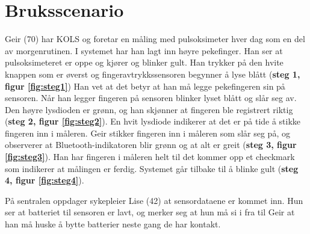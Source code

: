 \section{Bruksscenario}
Geir (70) har KOLS og foretar en måling med pulsoksimeter hver dag som en del av morgenrutinen. I systemet har han lagt
inn høyre pekefinger. Han ser at pulsoksimeteret
er oppe og kjører og blinker gult.
Han trykker på den hvite knappen som er øverst og fingeravtrykkssensoren begynner
å lyse blått (\textbf{steg 1, figur \ref{fig:steg1}})  Han vet at det betyr at han må legge pekefingeren sin på sensoren. Når han legger fingeren på sensoren blinker
lyset blått og slår seg av. Den høyre lysdioden er grønn, og han skjønner at fingeren ble registrert riktig (\textbf{steg 2, figur \ref{fig:steg2}}). En hvit lysdiode
indikerer at det er på tide å stikke fingeren inn i måleren. Geir stikker fingeren inn i måleren som slår seg på,
og observerer at Bluetooth-indikatoren blir grønn og at alt er greit (\textbf{steg 3, figur \ref{fig:steg3}}). Han har fingeren i måleren helt til det kommer opp et checkmark
som indikerer at målingen er ferdig. Systemet går tilbake til å blinke gult (\textbf{steg 4, figur \ref{fig:steg4}}).

På sentralen oppdager sykepleier Lise (42) at sensordataene er kommet inn. Hun ser at batteriet til sensoren er lavt, og merker seg at hun
må si i fra til Geir at han må huske å bytte batterier neste gang de har kontakt.

